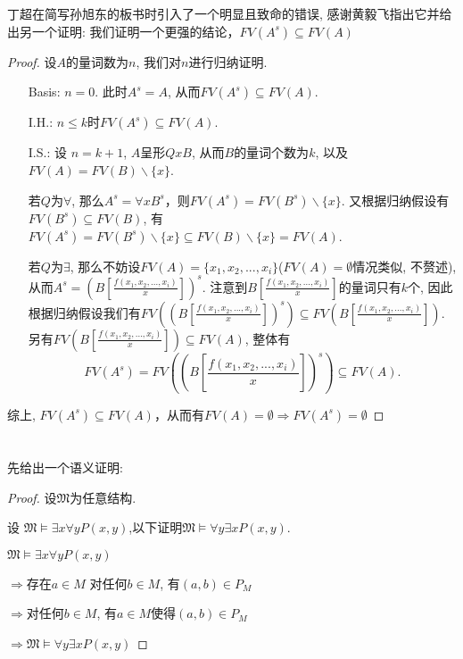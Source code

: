 \documentclass{article}
\begin{document}
\section{}
丁超在简写孙旭东的板书时引入了一个明显且致命的错误, 感谢黄毅飞指出它并给出另一个证明: 我们证明一个更强的结论，$FV(A^s) \subseteq FV(A)$
\begin{proof}
设$A$的量词数为$n$, 我们对$n$进行归纳证明. 
\begin{itemize}
	\item[Basis:] $n = 0$. 此时$A^s = A$, 从而$FV(A^s) \subseteq FV(A)$.
	\item[I.H.:] $n \le k$时$FV(A^s) \subseteq FV(A)$. 
	\item[I.S.:] 设 $n = k + 1$, $A$呈形$Q x B$, 从而$B$的量词个数为$k$, 以及$FV(A) = FV(B) \backslash \{x\}$. 
	
	若$Q$为$\forall$, 那么$A^s = \forall x B^s$，则$FV(A^s) = FV(B^s) \backslash \{x\}$. 又根据归纳假设有$FV(B^s) \subseteq FV(B)$, 有$FV(A^s) = FV(B^s) \backslash \{x\} \subseteq FV(B) \backslash \{x\} = FV(A)$. 
	
	若$Q$为$\exists$, 那么不妨设$FV(A) = \{x_1,x_2,...,x_i\}$($FV(A)=\emptyset$情况类似, 不赘述), 从而$A^s = (B[\frac{f(x_1,x_2,...,x_i)}{x}])^s$. 注意到$B[\frac{f(x_1,x_2,...,x_i)}{x}]$的量词只有$k$个, 因此根据归纳假设我们有$FV((B[\frac{f(x_1,x_2,...,x_i)}{x}])^s) \subseteq FV(B[\frac{f(x_1,x_2,...,x_i)}{x}])$. 	另有$FV(B[\frac{f(x_1,x_2,...,x_i)}{x}]) \subseteq FV(A)$, 整体有
	$$FV(A^s)=FV((B[\frac{f(x_1,x_2,...,x_i)}{x}])^s)  \subseteq FV(A).$$ 			
\end{itemize}
综上, $FV(A^s)  \subseteq FV(A)$，从而有$FV(A) = \emptyset \Rightarrow FV(A^s) = \emptyset$
\end{proof}
\section{}
先给出一个语义证明:

\begin{proof}
	
设$\mathfrak{M}$为任意结构.

设 $\mathfrak{M} \vDash \exists x \forall y P(x,y)$,以下证明$\mathfrak{M} \vDash \forall y \exists x  P(x,y)$. 

$\mathfrak{M} \vDash \exists x \forall y P(x,y)$

$\Rightarrow$存在$a \in M$ 对任何$b\in M$, 有$(a,b)\in P_M$

$ \Rightarrow$对任何$b\in M$, 有$a\in M$使得$(a,b)\in P_{M}$

$\Rightarrow \mathfrak{M}\vDash \forall y \exists x  P(x,y)$
\end{proof}
\end{document}
